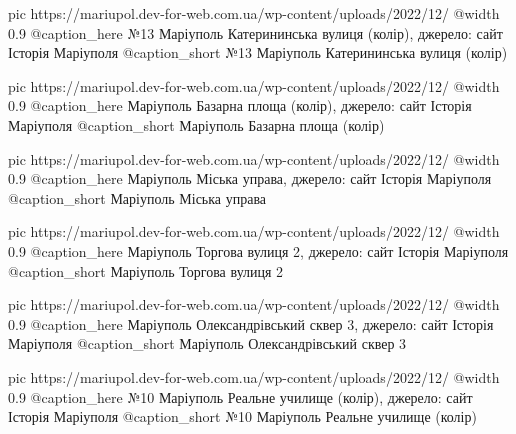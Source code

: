   pic https://mariupol.dev-for-web.com.ua/wp-content/uploads/2022/12/%
  @width 0.9
  @caption_here №13 Маріуполь Катерининська вулиця (колір), джерело: сайт Історія Маріуполя
  @caption_short №13 Маріуполь Катерининська вулиця (колір)

  pic https://mariupol.dev-for-web.com.ua/wp-content/uploads/2022/12/%
  @width 0.9
  @caption_here Маріуполь Базарна площа (колір), джерело: сайт Історія Маріуполя
  @caption_short Маріуполь Базарна площа (колір)

  pic https://mariupol.dev-for-web.com.ua/wp-content/uploads/2022/12/%
  @width 0.9
  @caption_here Маріуполь Міська управа, джерело: сайт Історія Маріуполя
  @caption_short Маріуполь Міська управа

  pic https://mariupol.dev-for-web.com.ua/wp-content/uploads/2022/12/%
  @width 0.9
  @caption_here Маріуполь Торгова вулиця 2, джерело: сайт Історія Маріуполя
  @caption_short Маріуполь Торгова вулиця 2

  pic https://mariupol.dev-for-web.com.ua/wp-content/uploads/2022/12/%
  @width 0.9
  @caption_here Маріуполь Олександрівський сквер 3, джерело: сайт Історія Маріуполя
  @caption_short Маріуполь Олександрівський сквер 3

  pic https://mariupol.dev-for-web.com.ua/wp-content/uploads/2022/12/%
  @width 0.9
  @caption_here №10 Маріуполь Реальне училище (колір), джерело: сайт Історія Маріуполя
  @caption_short №10 Маріуполь Реальне училище (колір)

